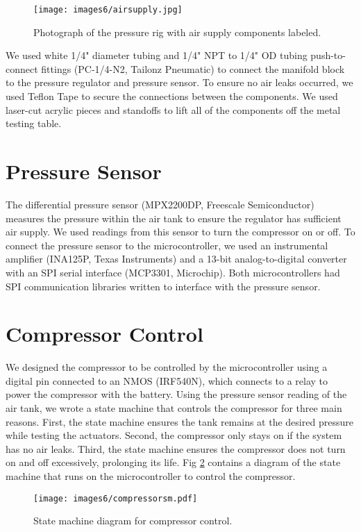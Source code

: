 \begin{figure}[!ht]
    \centering
    \texttt{[image: images6/airsupply.jpg]}
    \caption{Photograph of the pressure rig with air supply components labeled.}
    \label{fig:airsupply}
\end{figure}

We used white 1/4" diameter tubing and 1/4" NPT to 1/4" OD tubing push-to-connect fittings (PC-1/4-N2, Tailonz Pneumatic) to connect the manifold block to the pressure regulator and pressure sensor. To ensure no air leaks occurred, we used Teflon Tape to secure the connections between the components. We used laser-cut acrylic pieces and standoffs to lift all of the components off the metal testing table. 

\section{Pressure Sensor}

The differential pressure sensor (MPX2200DP, Freescale Semiconductor) measures the pressure within the air tank to ensure the regulator has sufficient air supply. We used readings from this sensor to turn the compressor on or off. To connect the pressure sensor to the microcontroller, we used an instrumental amplifier (INA125P, Texas Instruments) and a 13-bit analog-to-digital converter with an SPI serial interface (MCP3301, Microchip). Both microcontrollers had SPI communication libraries written to interface with the pressure sensor. 

\section{Compressor Control}

We designed the compressor to be controlled by the microcontroller using a digital pin connected to an NMOS (IRF540N), which connects to a relay to power the compressor with the battery. Using the pressure sensor reading of the air tank, we wrote a state machine that controls the compressor for three main reasons. First, the state machine ensures the tank remains at the desired pressure while testing the actuators. Second, the compressor only stays on if the system has no air leaks. Third, the state machine ensures the compressor does not turn on and off excessively, prolonging its life. Fig \ref{fig:compressorsm} contains a diagram of the state machine that runs on the microcontroller to control the compressor. 

\begin{figure}[ht]
    \centering
    \texttt{[image: images6/compressorsm.pdf]}
    \caption{State machine diagram for compressor control.}
    \label{fig:compressorsm}
\end{figure}

